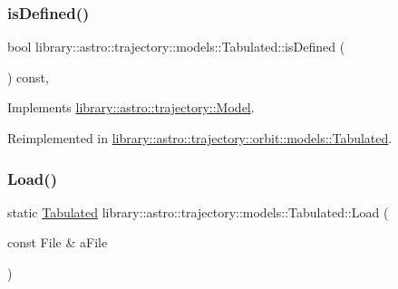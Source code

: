 \mbox{\label{classlibrary_1_1astro_1_1trajectory_1_1models_1_1_tabulated_ae967e30f6de74405671f992a5920883f}} 
\subsubsection{\texorpdfstring{is\+Defined()}{isDefined()}}
{\footnotesize\ttfamily bool library\+::astro\+::trajectory\+::models\+::\+Tabulated\+::is\+Defined (\begin{DoxyParamCaption}{ }\end{DoxyParamCaption}) const\hspace{0.3cm}{\ttfamily [override]}, {\ttfamily [virtual]}}



Implements \hyperlink{classlibrary_1_1astro_1_1trajectory_1_1_model_a9b55db62f22c3493313661bacd9f7c1b}{library\+::astro\+::trajectory\+::\+Model}.



Reimplemented in \hyperlink{classlibrary_1_1astro_1_1trajectory_1_1orbit_1_1models_1_1_tabulated_af68120eb6651e8461c02a465923e533f}{library\+::astro\+::trajectory\+::orbit\+::models\+::\+Tabulated}.

\mbox{\label{classlibrary_1_1astro_1_1trajectory_1_1models_1_1_tabulated_a63c053c7a308930aa03b354292c85c0f}} 
\subsubsection{\texorpdfstring{Load()}{Load()}}
{\footnotesize\ttfamily static \hyperlink{classlibrary_1_1astro_1_1trajectory_1_1models_1_1_tabulated}{Tabulated} library\+::astro\+::trajectory\+::models\+::\+Tabulated\+::\+Load (\begin{DoxyParamCaption}\item[{const File \&}]{a\+File }\end{DoxyParamCaption})\hspace{0.3cm}{\ttfamily [static]}}

